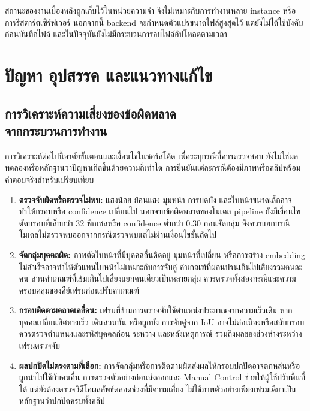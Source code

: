 สถานะของงานเบื้องหลังถูกเก็บไว้ในหน่วยความจำ จึงไม่เหมาะกับการทำงานหลาย instance หรือการรีสตาร์ตเซิร์ฟเวอร์ นอกจากนี้ backend จะกำหนดตัวแปรขนาดไฟล์สูงสุดไว้ แต่ยังไม่ได้ใช้บังคับก่อนบันทึกไฟล์ และในปัจจุบันยังไม่มีกระบวนการลบไฟล์อัปโหลดตามเวลา

\section{ปัญหา อุปสรรค และแนวทางแก้ไข}

\subsection[การวิเคราะห์ความเสี่ยงของข้อผิดพลาดจากกระบวนการทำงาน]{การวิเคราะห์ความเสี่ยงของข้อผิดพลาด\\จากกระบวนการทำงาน}

การวิเคราะห์ต่อไปนี้อาศัยขั้นตอนและเงื่อนไขในซอร์สโค้ด เพื่อระบุกรณีที่ควรตรวจสอบ ยังไม่ใช่ผลทดลองหรือหลักฐานว่าปัญหาเกิดขึ้นด้วยความถี่เท่าใด การยืนยันแต่ละกรณีต้องมีภาพหรือคลิปพร้อมคำตอบจริงสำหรับเปรียบเทียบ

\begin{enumerate}[
  label=(\arabic*),
  labelindent=0pt,
  leftmargin=\firstindentlength,
  labelwidth=0.65\firstindentlength,
  labelsep=0.35\firstindentlength,
  itemindent=0pt,
  align=left,
  listparindent=0pt,
  topsep=0.4\baselineskip,
  itemsep=0.4\baselineskip,
  parsep=0pt
]
  \item \textbf{ตรวจจับผิดหรือตรวจไม่พบ:} แสงน้อย ย้อนแสง มุมหน้า การบดบัง และใบหน้าขนาดเล็กอาจทำให้กรอบหรือ confidence เปลี่ยนไป นอกจากข้อผิดพลาดของโมเดล pipeline ยังมีเงื่อนไขตัดกรอบที่เล็กกว่า 32 พิกเซลหรือ confidence ต่ำกว่า 0.30 ก่อนจัดกลุ่ม จึงควรแยกกรณีโมเดลไม่ตรวจพบออกจากกรณีตรวจพบแต่ไม่ผ่านเงื่อนไขขั้นถัดไป
  \item \textbf{จัดกลุ่มบุคคลผิด:} ภาพตัดใบหน้าที่มีบุคคลอื่นติดอยู่ มุมหน้าที่เปลี่ยน หรือการสร้าง embedding ไม่สำเร็จอาจทำให้ตัวแทนใบหน้าไม่เหมาะกับการจับคู่ ค่าเกณฑ์ที่ผ่อนปรนเกินไปเสี่ยงรวมคนละคน ส่วนค่าเกณฑ์ที่เข้มเกินไปเสี่ยงแยกคนเดียวเป็นหลายกลุ่ม ควรตรวจทั้งสองกรณีและความครอบคลุมของคีย์เฟรมก่อนปรับค่าเกณฑ์
  \item \textbf{กรอบติดตามคลาดเคลื่อน:} เฟรมที่ข้ามการตรวจจับใช้ตำแหน่งประมาณจากความเร็วเดิม หากบุคคลเปลี่ยนทิศทางเร็ว เดินสวนกัน หรือถูกบัง การจับคู่จาก IoU อาจไม่ต่อเนื่องหรือสลับกรอบ ควรตรวจตำแหน่งและรหัสบุคคลก่อน ระหว่าง และหลังเหตุการณ์ รวมถึงผลของช่วงห่างระหว่างเฟรมตรวจจับ
  \item \textbf{ผลปกปิดไม่ตรงตามที่เลือก:} การจัดกลุ่มหรือการติดตามผิดส่งผลให้กรอบปกปิดอาจตกหล่นหรือถูกนำไปใช้กับคนอื่น การตรวจตัวอย่างก่อนส่งออกและ Manual Control ช่วยให้ผู้ใช้ปรับพื้นที่ได้ แต่ยังต้องตรวจวิดีโอผลลัพธ์ตลอดช่วงที่มีความเสี่ยง ไม่ใช้ภาพตัวอย่างเพียงเฟรมเดียวเป็นหลักฐานว่าปกปิดครบทั้งคลิป
\end{enumerate}

